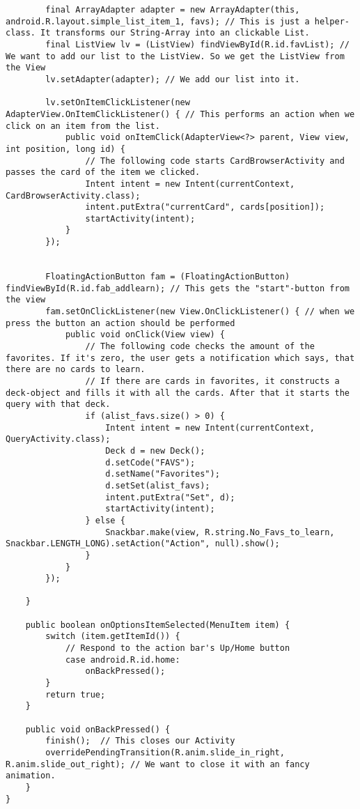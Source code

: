 \begin{lstlisting}
        final ArrayAdapter adapter = new ArrayAdapter(this, android.R.layout.simple_list_item_1, favs); // This is just a helper-class. It transforms our String-Array into an clickable List.
        final ListView lv = (ListView) findViewById(R.id.favList); // We want to add our list to the ListView. So we get the ListView from the View
        lv.setAdapter(adapter); // We add our list into it.

        lv.setOnItemClickListener(new AdapterView.OnItemClickListener() { // This performs an action when we click on an item from the list.
            public void onItemClick(AdapterView<?> parent, View view, int position, long id) {
                // The following code starts CardBrowserActivity and passes the card of the item we clicked.
                Intent intent = new Intent(currentContext, CardBrowserActivity.class);
                intent.putExtra("currentCard", cards[position]);
                startActivity(intent);
            }
        });


        FloatingActionButton fam = (FloatingActionButton) findViewById(R.id.fab_addlearn); // This gets the "start"-button from the view
        fam.setOnClickListener(new View.OnClickListener() { // when we press the button an action should be performed
            public void onClick(View view) {
                // The following code checks the amount of the favorites. If it's zero, the user gets a notification which says, that there are no cards to learn.
                // If there are cards in favorites, it constructs a deck-object and fills it with all the cards. After that it starts the query with that deck.
                if (alist_favs.size() > 0) {
                    Intent intent = new Intent(currentContext, QueryActivity.class);
                    Deck d = new Deck();
                    d.setCode("FAVS");
                    d.setName("Favorites");
                    d.setSet(alist_favs);
                    intent.putExtra("Set", d);
                    startActivity(intent);
                } else {
                    Snackbar.make(view, R.string.No_Favs_to_learn, Snackbar.LENGTH_LONG).setAction("Action", null).show();
                }
            }
        });

    }

    public boolean onOptionsItemSelected(MenuItem item) {
        switch (item.getItemId()) {
            // Respond to the action bar's Up/Home button
            case android.R.id.home:
                onBackPressed();
        }
        return true;
    }

    public void onBackPressed() {
        finish();  // This closes our Activity
        overridePendingTransition(R.anim.slide_in_right, R.anim.slide_out_right); // We want to close it with an fancy animation.
    }
}
\end{lstlisting}
\newpage
